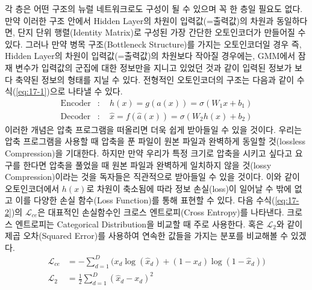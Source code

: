 \documentclass[draft=false]{oblivoir}
\begin{document}
각 층은 어떤 구조의 뉴럴 네트워크로도 구성이 될 수 있으며 꼭 한 층일 필요도 없다. 만약 이러한 구조 안에서 Hidden Layer의 차원이 입력값(=출력값)의 차원과 동일하다면, 단지 단위 행렬(Identity Matrix)로 구성된 가장 간단한 오토인코더가 만들어질 수 있다. 그러나 만약 병목 구조(Bottleneck Structure)를 가지는 오토인코더일 경우 즉, Hidden Layer의 차원이 입력값(=출력값)의 차원보다 작아질 경우에는, GMM에서 잠재 변수가 입력값의 군집에 대한 정보만을 지니고 있었던 것과 같이 입력된 정보가 보다 축약된 정보의 형태를 지닐 수 있다. 전형적인 오토인코더의 구조는 다음과 같이 수식(\ref{eq:17-1})으로 나타낼 수 있다.
\begin{equation}
	\begin{split}
    \mathrm{Encoder} &: \quad h(x) = g(a(x)) = \sigma (W_{1}x + b_1)\\
	\mathrm{Decoder} &: \quad \hat{x} = f(\hat{a}(x)) = \sigma (W_{2}h(x) + b_2)
	\end{split}
	\label{eq:17-1}
\end{equation}
 이러한 개념은 압축 프로그램을 떠올리면 더욱 쉽게 받아들일 수 있을 것이다. 우리는 압축 프로그램을 사용할 때 압축을 푼 파일이 원본 파일과 완벽하게 동일할 것(lossless Compression)을 기대한다. 하지만 만약 우리가 특정 크기로 압축을 시키고 싶다고 요구를 한다면 압축을 풀었을 때 원본 파일과 완벽하게 일치하지 않을 것(lossy Compression)이라는 것을 독자들은 직관적으로 받아들일 수 있을 것이다. 이와 같이 오토인코더에서 $h(x)$로 차원이 축소됨에 따라 정보 손실(loss)이 일어날 수 밖에 없고 이를 다양한 손실 함수(Loss Function)를 통해 표현할 수 있다. 다음 수식(\ref{eq:17-2})의 $\mathcal{L}_{ce}$은 대표적인 손실함수인 크로스 엔트로피(Cross Entropy)를 나타낸다. 크로스 엔트로피는 Categorical Distribution을 비교할 때 주로 사용한다. 혹은 $\mathcal{L}_2$와 같이 제곱 오차(Squared Error)를 사용하여 연속한 값들을 가지는 분포를 비교해볼 수 있겠다.
 \begin{equation}
    \begin{split}
        \mathcal{L}_{ce} & = -\sum_{d=1}^{D}\big(x_{d}\log{(\hat{x}_d)} + (1-x_{d})\log{(1-\hat{x}_d)\big)}\\
 	\mathcal{L}_{2} & = \frac{1}{2}\sum_{d=1}^{D}(\hat{x}_d - x_d)^{2}
    \end{split}
    \label{eq:17-2}
 \end{equation}

\end{document}

